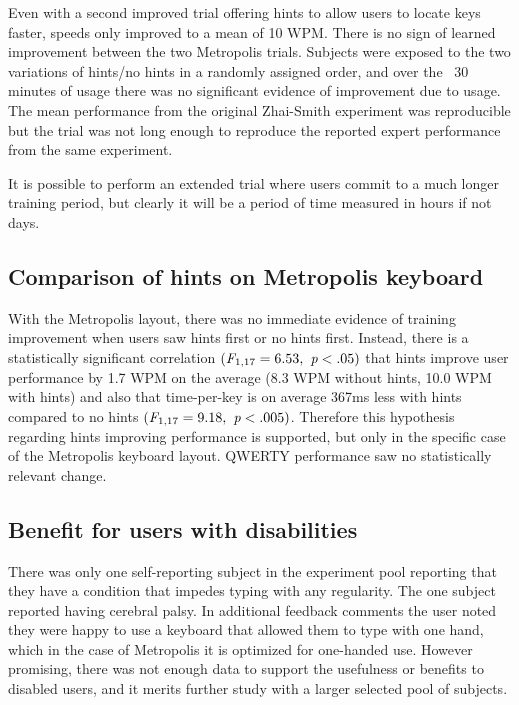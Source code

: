 \documentclass[english]{vgtc}
\begin{document}
Even with a second improved trial offering hints to allow users to locate keys faster, speeds only improved to a mean of 10 WPM.  There is no sign of learned improvement between the two Metropolis trials.  Subjects were exposed to the two variations of hints/no hints in a randomly assigned order, and over the ~30 minutes of usage there was no significant evidence of improvement due to usage. The mean performance from the original Zhai-Smith experiment was reproducible but the trial was not long enough to reproduce the reported expert performance from the same experiment.

It is possible to perform an extended trial where users commit to a much longer training period, but clearly it will be a period of time measured in hours if not days.

\subsection{Comparison of hints on Metropolis keyboard}

With the Metropolis layout, there was no immediate evidence of training improvement when users saw hints first or no hints first. Instead, there is a statistically significant correlation $(\emph{F}_{1,17} = 6.53, \emph{ p}<.05)$ that hints improve user performance by 1.7 WPM on the average (8.3 WPM without hints, 10.0 WPM with hints) and also that time-per-key is on average 367ms less with hints compared to no hints $(\emph{F}_{1,17} = 9.18, \emph{ p}<.005)$.  Therefore this hypothesis regarding hints improving performance is supported, but only in the specific case of the Metropolis keyboard layout.  QWERTY performance saw no statistically relevant change.

\subsection{Benefit for users with disabilities}

There was only one self-reporting subject in the experiment pool reporting that they have a condition that impedes typing with any regularity.  The one subject reported having cerebral palsy. In additional feedback comments the user noted they were happy to use a keyboard that allowed them to type with one hand, which in the case of Metropolis it is optimized for one-handed use.  However promising, there was not enough data to support the usefulness or benefits to disabled users, and it merits further study with a larger selected pool of subjects.
\end{document}
